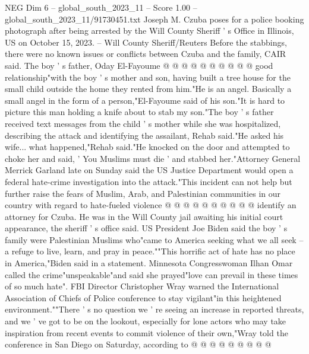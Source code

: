 \begin{textsample}{NEG Dim 6 – global\_south\_2023\_11 – Score 1.00 – global\_south\_2023\_11/91730451.txt}
Joseph M.
Czuba poses for a police booking photograph after being arrested by the Will County Sheriff ' s Office in Illinois, US on October 15, 2023. -- Will County Sheriff/Reuters Before the stabbings, there were no known issues or conflicts between Czuba and the family, CAIR said.
The boy ' s father, Oday El-Fayoume @ @ @ @ @ @ @ @ @ @ good relationship"with the boy ' s mother and son, having built a tree house for the small child outside the home they rented from him."He is an angel.
Basically a small angel in the form of a person,"El-Fayoume said of his son."It is hard to picture this man holding a knife about to stab my son."The boy ' s father received text messages from the child ' s mother while she was hospitalized, describing the attack and identifying the assailant, Rehab said."He asked his wife... what happened,"Rehab said."He knocked on the door and attempted to choke her and said, ' You Muslims must die ' and stabbed her."Attorney General Merrick Garland late on Sunday said the US Justice Department would open a federal hate-crime investigation into the attack."This incident can not help but further raise the fears of Muslim, Arab, and Palestinian communities in our country with regard to hate-fueled violence @ @ @ @ @ @ @ @ @ @ identify an attorney for Czuba.
He was in the Will County jail awaiting his initial court appearance, the sheriff ' s office said.
US President Joe Biden said the boy ' s family were Palestinian Muslims who"came to America seeking what we all seek -- a refuge to live, learn, and pray in peace.""This horrific act of hate has no place in America,"Biden said in a statement.
Minnesota Congresswoman Ilhan Omar called the crime"unspeakable"and said she prayed"love can prevail in these times of so much hate".
FBI Director Christopher Wray warned the International Association of Chiefs of Police conference to stay vigilant"in this heightened environment.""There ' s no question we ' re seeing an increase in reported threats, and we ' ve got to be on the lookout, especially for lone actors who may take inspiration from recent events to commit violence of their own,"Wray told the conference in San Diego on Saturday, according to @ @ @ @ @ @ @ @ @

\end{textsample}
